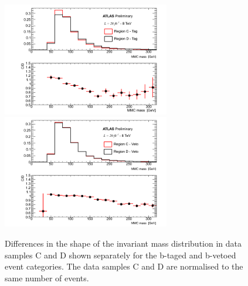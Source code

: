 \begin{figure}[tp]
	\begin{center}
	\includegraphics[width=0.65\textwidth]{figure/QCD/shape_tag.png}
	\includegraphics[width=0.65\textwidth]{figure/QCD/shape_veto.png}
	\end{center}
	\caption{Differences in the shape of the invariant \mmc mass distribution in data samples  C and D shown 
	separately for the b-taged  and b-vetoed event categories. The data samples C and D are normalised to the same 
	number of events.}
	\label{fig:qcd_shape_unc}
\end{figure}






